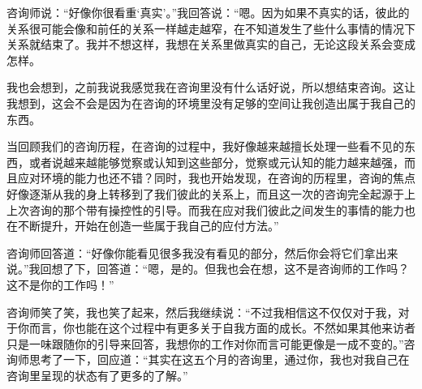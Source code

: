 咨询师说：“好像你很看重‘真实’。”我回答说：“嗯。因为如果不真实的话，彼此的关系很可能会像和前任的关系一样越走越窄，在不知道发生了些什么事情的情况下关系就结束了。我并不想这样，我想在关系里做真实的自己，无论这段关系会变成怎样。

我也会想到，之前我说我感觉我在咨询里没有什么话好说，所以想结束咨询。这让我想到，这会不会是因为在咨询的环境里没有足够的空间让我创造出属于我自己的东西。

当回顾我们的咨询历程，在咨询的过程中，我好像越来越擅长处理一些看不见的东西，或者说越来越能够觉察或认知到这些部分，觉察或元认知的能力越来越强，而且应对环境的能力也还不错？同时，我也开始发现，在咨询的历程里，咨询的焦点好像逐渐从我的身上转移到了我们彼此的关系上，而且这一次的咨询完全起源于上上次咨询的那个带有操控性的引导。而我在应对我们彼此之间发生的事情的能力也在不断提升，开始在创造一些属于我自己的应付方法。”

咨询师回答道：“好像你能看见很多我没有看见的部分，然后你会将它们拿出来说。”我回想了下，回答道：“嗯，是的。但我也会在想，这不是咨询师的工作吗？这不是你的工作吗！”

咨询师笑了笑，我也笑了起来，然后我继续说：“不过我相信这不仅仅对于我，对于你而言，你也能在这个过程中有更多关于自我方面的成长。不然如果其他来访者只是一味跟随你的引导来回答，我想你的工作对你而言可能更像是一成不变的。”咨询师思考了一下，回应道：“其实在这五个月的咨询里，通过你，我也对我自己在咨询里呈现的状态有了更多的了解。”


